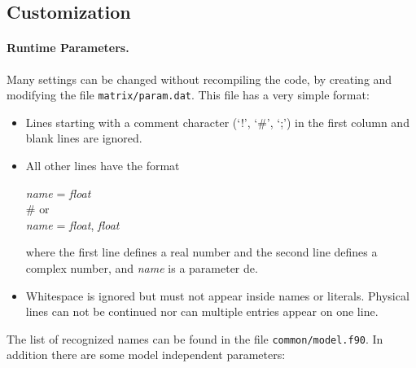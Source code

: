 \documentclass[11pt,a4paper]{refrep}
\begin{document}
\subsection{Customization}
\paragraph{Runtime Parameters.}
Many settings can be changed without recompiling the code, by
creating and modifying the file \texttt{matrix/param.dat}.
This file has a very simple format:
\begin{itemize}
\item Lines starting with a comment character (`!', `\#', `;')
      in the first column and blank lines are ignored.
\item All other lines have the format
\begin{example}
\textit{name} = \textit{float}\\
\# \textrm{or}\\
\textit{name} = \textit{float}, \textit{float}
\end{example}
      where the first line defines a real number and the second
      line defines a complex number, and \textit{name} is a 
      parameter de.
\item Whitespace is ignored but must not appear inside names or
      literals. Physical lines can not be continued nor can
      multiple entries appear on one line.
\end{itemize}
The list of recognized names can be found in the file
\texttt{common/model.f90}. In addition there are some model
independent parameters:
\smallskip
\end{document}
